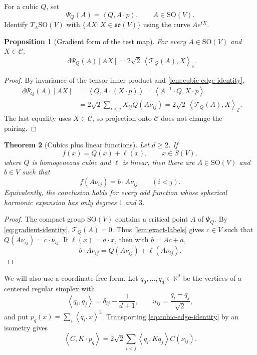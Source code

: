 \documentclass[11pt,reqno]{amsart}
\newtheorem{theorem}{Theorem}[section]
\newtheorem{proposition}[theorem]{Proposition}
\theoremstyle{definition}
\theoremstyle{remark}
\newcommand{\R}{\mathbb R}
\newcommand{\SO}{\mathrm{SO}}
\newcommand{\dd}{\mathop{}\!\mathrm d}
\newcommand{\cE}{\mathcal E}
\newcommand{\cC}{\mathcal C}
\newcommand{\cT}{\mathcal T}
\newcommand{\ip}[2]{\left\langle #1,#2\right\rangle}
\begin{document}
For a cubic $Q$, set
\[
\Psi_Q(A)=\ip{Q}{A\cdot p},\qquad A\in\SO(V).
\]
Identify $T_A\SO(V)$ with $\{AX:X\in\mathfrak{so}(V)\}$ using the curve
$Ae^{tX}$.

\begin{proposition}[Gradient form of the test map]\label{prop:gradient}
For every $A\in\SO(V)$ and $X\in\cC$,
\begin{equation}\label{eq:gradient-identity}
\dd\Psi_Q(A)[AX]
=2\sqrt2\,\ip{\cT_Q(A)}{X}_{\cE}.
\end{equation}
\end{proposition}

\begin{proof}
By invariance of the tensor inner product and
\cref{lem:cubic-edge-identity},
\begin{align*}
\dd\Psi_Q(A)[AX]
&=\ip{Q}{A\cdot(X\cdot p)}
 =\ip{A^{-1}\cdot Q}{X\cdot p}\\
&=2\sqrt2\sum_{i<j}X_{ij}Q(A\nu_{ij})
 =2\sqrt2\,\ip{\cT_Q(A)}{X}_{\cE}.
\end{align*}
The last equality uses $X\in\cC$, so projection onto $\cC$ does not change
the pairing.
\end{proof}

\begin{theorem}[Cubics plus linear functions]\label{thm:cubics}
Let $d\ge2$.  If
\[
f(x)=Q(x)+\ell(x),\qquad x\in S(V),
\]
where $Q$ is homogeneous cubic and $\ell$ is linear, then there are
$A\in\SO(V)$ and $b\in V$ such that
\[
f(A\nu_{ij})=b\cdot A\nu_{ij}\qquad(i<j).
\]
Equivalently, the conclusion holds for every odd function whose spherical
harmonic expansion has only degrees $1$ and $3$.
\end{theorem}

\begin{proof}
The compact group $\SO(V)$ contains a critical point $A$ of $\Psi_Q$.
By \eqref{eq:gradient-identity}, $\cT_Q(A)=0$.  Thus
\cref{lem:exact-labels} gives $c\in V$ such that
$Q(A\nu_{ij})=c\cdot\nu_{ij}$.  If $\ell(x)=a\cdot x$, then with
$b=Ac+a$,
\[
b\cdot A\nu_{ij}=Q(A\nu_{ij})+\ell(A\nu_{ij}).
\]
\end{proof}

We will also use a coordinate-free form.  Let
$q_0,\dots,q_d\in\R^d$ be the vertices of a centered regular simplex with
\[
\ip{q_i}{q_j}=\delta_{ij}-\frac1{d+1},
\qquad
u_{ij}=\frac{q_i-q_j}{\sqrt2},
\]
and put $p_q(x)=\sum_i\ip{q_i}{x}^3$.  Transporting
\eqref{eq:cubic-edge-identity} by an isometry gives
\begin{equation}\label{eq:coordinate-free-cubic}
\ip{C}{K\cdot p_q}
=2\sqrt2\sum_{i<j}\ip{q_i}{Kq_j}C(\nu_{ij}).
\end{equation}
\end{document}
